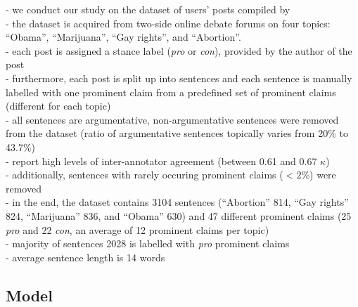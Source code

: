 - we conduct our study on the dataset of users' posts compiled by \citet{hasan2014you} \\
- the dataset is acquired from two-side online debate forums on four topics: 
``Obama'', ``Marijuana'', ``Gay rights'', and ``Abortion''. \\
- each post is assigned a stance label (\textit{pro} or \textit{con}), provided
by the author of the post \\
- furthermore, each post is split up into sentences and each sentence is manually labelled
with one prominent claim from a predefined set of prominent claims 
(different for each topic) \\
- all sentences are argumentative, non-argumentative sentences were removed from the 
dataset (ratio of argumentative sentences topically varies from  20\% to 43.7\%) \\
- \citet{hasan2014you} report high levels of inter-annotator agreement (between
0.61 and 0.67 $\kappa$) \\
- additionally, sentences with rarely occuring prominent claims ($<2\%$) were removed \\
- in the end, the dataset contains 3104 sentences (``Abortion'' 814, ``Gay rights'' 824, 
``Marijuana'' 836, and ``Obama'' 630) and 47 different prominent claims 
(25 \textit{pro} and 22 \textit{con}, an average of 12 prominent claims per topic) \\
- majority of sentences 2028 is labelled with \textit{pro} prominent claims \\
- average sentence length is 14 words \\ 

\subsection{Model}

